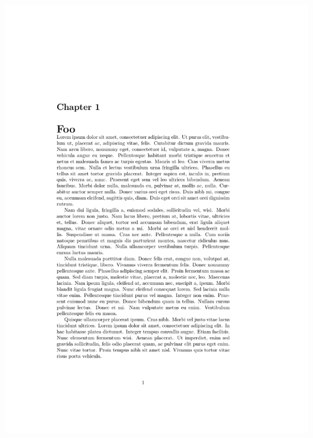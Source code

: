 \documentclass{beamer}
\begin{document}
\begin{frame}[fragile]
\begin{overprint}
\begin{columns}
      \begin{column}{0.5\textwidth}
        \begin{latexcode}
          \setlength\afterchapskip{0pt}
        \end{latexcode}
        \begin{center}
          \includegraphics[frame,page=1,width=0.8\linewidth]{examples/afterchaptertitle-2}
        \end{center}
      \end{column}
    \end{columns}


\end{overprint}
\end{frame}
\end{document}
